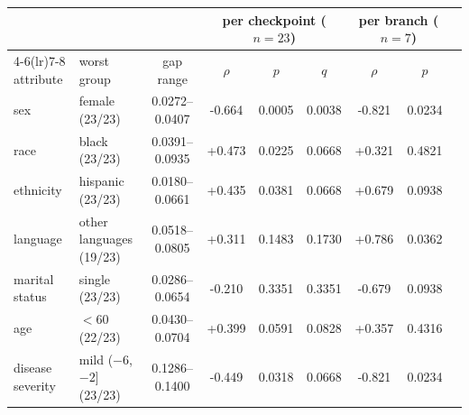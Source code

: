 \begin{tabular}{llccccccc}
\toprule
& & & \multicolumn{3}{c}{per checkpoint ($n{=}23$)} & \multicolumn{2}{c}{per branch ($n{=}7$)} \\
\cmidrule(lr){4-6}\cmidrule(lr){7-8}
attribute & worst group & gap range & $\rho$ & $p$ & $q$ & $\rho$ & $p$ \\
\midrule
sex & female (23/23) & 0.0272--0.0407 & -0.664 & 0.0005 & 0.0038 & -0.821 & 0.0234 \\
race & black (23/23) & 0.0391--0.0935 & +0.473 & 0.0225 & 0.0668 & +0.321 & 0.4821 \\
ethnicity & hispanic (23/23) & 0.0180--0.0661 & +0.435 & 0.0381 & 0.0668 & +0.679 & 0.0938 \\
language & other languages (19/23) & 0.0518--0.0805 & +0.311 & 0.1483 & 0.1730 & +0.786 & 0.0362 \\
marital status & single (23/23) & 0.0286--0.0654 & -0.210 & 0.3351 & 0.3351 & -0.679 & 0.0938 \\
age & $<$60 (22/23) & 0.0430--0.0704 & +0.399 & 0.0591 & 0.0828 & +0.357 & 0.4316 \\
disease severity & mild ($-6$,$-2$] (23/23) & 0.1286--0.1400 & -0.449 & 0.0318 & 0.0668 & -0.821 & 0.0234 \\
\bottomrule
\end{tabular}

